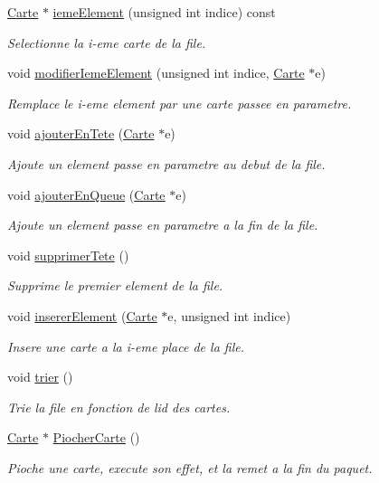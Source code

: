 \begin{DoxyCompactItemize}
\hyperlink{classCarte}{Carte} $\ast$ \hyperlink{classPaquetCaisseComm_ac3aa3b696803e1afaf3a978b19c49cd1}{ieme\+Element} (unsigned int indice) const 
\begin{DoxyCompactList}\small\item\em Selectionne la i-\/eme carte de la file. \end{DoxyCompactList}\item 
void \hyperlink{classPaquetCaisseComm_a3754d7aa4b776ea756c48883ae124bf6}{modifier\+Ieme\+Element} (unsigned int indice, \hyperlink{classCarte}{Carte} $\ast$e)
\begin{DoxyCompactList}\small\item\em Remplace le i-\/eme element par une carte passee en parametre. \end{DoxyCompactList}\item 
void \hyperlink{classPaquetCaisseComm_ada42acf9646a98e6fa4231a99c3106ac}{ajouter\+En\+Tete} (\hyperlink{classCarte}{Carte} $\ast$e)
\begin{DoxyCompactList}\small\item\em Ajoute un element passe en parametre au debut de la file. \end{DoxyCompactList}\item 
void \hyperlink{classPaquetCaisseComm_a90365361fe2b32fe7327f5ea081fc859}{ajouter\+En\+Queue} (\hyperlink{classCarte}{Carte} $\ast$e)
\begin{DoxyCompactList}\small\item\em Ajoute un element passe en parametre a la fin de la file. \end{DoxyCompactList}\item 
void \hyperlink{classPaquetCaisseComm_a2327d7c648c57284d7d3d43d497bc707}{supprimer\+Tete} ()
\begin{DoxyCompactList}\small\item\em Supprime le premier element de la file. \end{DoxyCompactList}\item 
void \hyperlink{classPaquetCaisseComm_a7fe35a8526b71bde8c994ecea7c17086}{inserer\+Element} (\hyperlink{classCarte}{Carte} $\ast$e, unsigned int indice)
\begin{DoxyCompactList}\small\item\em Insere une carte a la i-\/eme place de la file. \end{DoxyCompactList}\item 
void \hyperlink{classPaquetCaisseComm_a63bee5d115614b01e31f6adb7ec6059d}{trier} ()
\begin{DoxyCompactList}\small\item\em Trie la file en fonction de l\textquotesingle{}id des cartes. \end{DoxyCompactList}\item 
\hyperlink{classCarte}{Carte} $\ast$ \hyperlink{classPaquetCaisseComm_a672f8287e8e43aad21694d5a26bd7de2}{Piocher\+Carte} ()
\begin{DoxyCompactList}\small\item\em Pioche une carte, execute son effet, et la remet a la fin du paquet. \end{DoxyCompactList}\end{DoxyCompactItemize}
